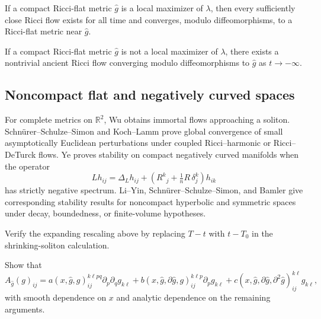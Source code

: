 \begin{theorem}
\label{thm:chow-iv-ricci-flat-lambda-stability}


If a compact Ricci-flat metric $\hat g$ is a local maximizer of $\lambda$, then
every sufficiently close Ricci flow exists for all time and converges, modulo
diffeomorphisms, to a Ricci-flat metric near $\hat g$.
\end{theorem}

\begin{theorem}
\label{thm:chow-iv-ricci-flat-lambda-instability}

If a compact Ricci-flat metric $\hat g$ is not a local maximizer of $\lambda$,
there exists a nontrivial ancient Ricci flow converging modulo diffeomorphisms
to $\hat g$ as $t\to-\infty$.
\end{theorem}

\subsection{Noncompact flat and negatively curved spaces}

For complete metrics on $\mathbb R^2$, Wu obtains immortal flows approaching a
soliton.  Schn\"urer--Schulze--Simon and Koch--Lamm prove global convergence of
small asymptotically Euclidean perturbations under coupled Ricci--harmonic or
Ricci--DeTurck flows.  Ye proves stability on compact negatively curved
manifolds when the operator
\[
 Lh_{ij}=\Delta_Lh_{ij}+\left(R^k{}_j+\tfrac1nR\,\delta^k_j\right)h_{ik}
\]
has strictly negative spectrum.  Li--Yin, Schn\"urer--Schulze--Simon, and Bamler
give corresponding stability results for noncompact hyperbolic and symmetric
spaces under decay, boundedness, or finite-volume hypotheses.

\begin{exercise}
\label{ex:chow-iv-expanding-soliton-rescaling}
Verify the expanding rescaling above by replacing $T-t$ with $t-T_0$ in the
shrinking-soliton calculation.
\end{exercise}

\begin{exercise}
\label{ex:chow-iv-local-ricci-deturck}
Show that
\begin{equation*}
 A_{\hat g}(g)_{ij}=a(x,\hat g,g)_{ij}^{k\ell pq}\partial_p\partial_qg_{k\ell}
 +b(x,\hat g,\partial\hat g,g)_{ij}^{k\ell p}\partial_pg_{k\ell}
 +c(x,\hat g,\partial\hat g,\partial^2\hat g)_{ij}^{k\ell}g_{k\ell},
 \tag{35.6}
\end{equation*}
with smooth dependence on $x$ and analytic dependence on the remaining
arguments.
\end{exercise}
